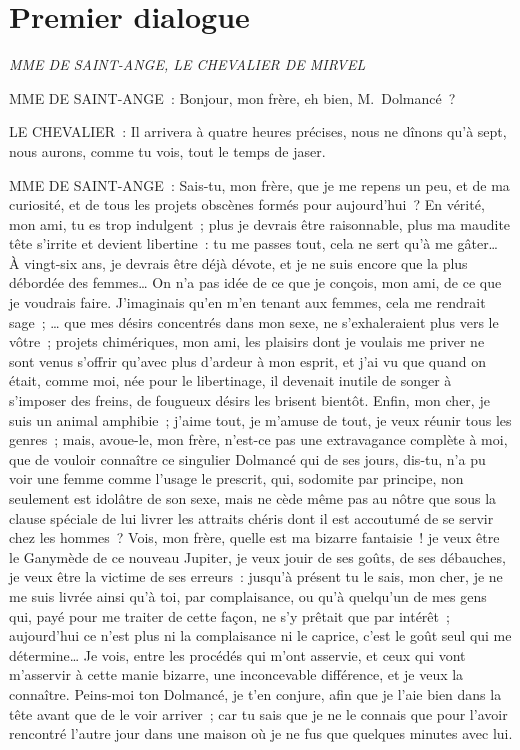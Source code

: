 \documentclass[french,twoside]{book} %
\begin{document}
\section[{Premier dialogue}]{Premier dialogue}
\label{d1}\renewcommand{\leftmark}{Premier dialogue}

\textit{MME DE SAINT-ANGE, LE CHEVALIER DE MIRVEL}\par
\noindent MME DE SAINT-ANGE : Bonjour, mon frère, eh bien, M. Dolmancé ?\par
LE CHEVALIER : Il arrivera à quatre heures précises, nous ne dînons qu’à sept, nous aurons, comme tu vois, tout le temps de jaser.\par
MME DE SAINT-ANGE : Sais-tu, mon frère, que je me repens un peu, et de ma curiosité, et de tous les projets obscènes formés pour aujourd’hui ? En vérité, mon ami, tu es trop indulgent ; plus je devrais être raisonnable, plus ma maudite tête s’irrite et devient libertine : tu me passes tout, cela ne sert qu’à me gâter… À vingt-six ans, je devrais être déjà dévote, et je ne suis encore que la plus débordée des femmes… On n’a pas idée de ce que je conçois, mon ami, de ce que je voudrais faire. J’imaginais qu’en m’en tenant aux femmes, cela me rendrait sage ; … que mes désirs concentrés dans mon sexe, ne s’exhaleraient plus vers le vôtre ; projets chimériques, mon ami, les plaisirs dont je voulais me priver ne sont venus s’offrir qu’avec plus d’ardeur à mon esprit, et j’ai vu que quand on était, comme moi, née pour le libertinage, il devenait inutile de songer à s’imposer des freins, de fougueux désirs les brisent bientôt. Enfin, mon cher, je suis un animal amphibie ; j’aime tout, je m’amuse de tout, je veux réunir tous les genres ; mais, avoue-le, mon frère, n’est-ce pas une extravagance complète à moi, que de vouloir connaître ce singulier Dolmancé qui de ses jours, dis-tu, n’a pu voir une femme comme l’usage le prescrit, qui, sodomite par principe, non seulement est idolâtre de son sexe, mais ne cède même pas au nôtre que sous la clause spéciale de lui livrer les attraits chéris dont il est accoutumé de se servir chez les hommes ? Vois, mon frère, quelle est ma bizarre fantaisie ! je veux être le Ganymède de ce nouveau Jupiter, je veux jouir de ses goûts, de ses débauches, je veux être la victime de ses erreurs : jusqu’à présent tu le sais, mon cher, je ne me suis livrée ainsi qu’à toi, par complaisance, ou qu’à quelqu’un de mes gens qui, payé pour me traiter de cette façon, ne s’y prêtait que par intérêt ; aujourd’hui ce n’est plus ni la complaisance ni le caprice, c’est le goût seul qui me détermine… Je vois, entre les procédés qui m’ont asservie, et ceux qui vont m’asservir à cette manie bizarre, une inconcevable différence, et je veux la connaître. Peins-moi ton Dolmancé, je t’en conjure, afin que je l’aie bien dans la tête avant que de le voir arriver ; car tu sais que je ne le connais que pour l’avoir rencontré l’autre jour dans une maison où je ne fus que quelques minutes avec lui.\par
\end{document}

